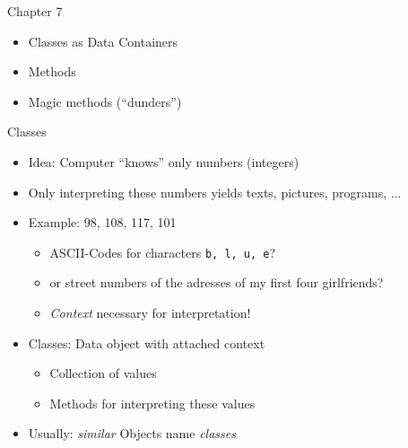 
\begin{frame}[fragile]{Chapter 7}
%
\begin{itemize}
\item Classes as Data Containers
\item Methods
\item Magic methods (\enquote{dunders})
\end{itemize}
%
\end{frame}


\begin{frame}{Classes}
%
\begin{itemize}
\item Idea: Computer \enquote{knows} only numbers (integers)
\item Only interpreting these numbers yields texts, pictures, programs, ...
\item Example: 98, 108, 117, 101
	\begin{itemize}
	\item ASCII-Codes for characters \texttt{b, l, u, e}?
	\item or street numbers of the adresses of my first four girlfriends?
	\item \emph{Context} necessary for interpretation!
	\end{itemize}
\item Classes: Data object with attached context
	\begin{itemize}
	\item Collection of values
	\item Methods for interpreting these values
	\end{itemize}
\item Usually: \emph{similar} Objects \Thus name \emph{classes}
\end{itemize}
%
\end{frame}


